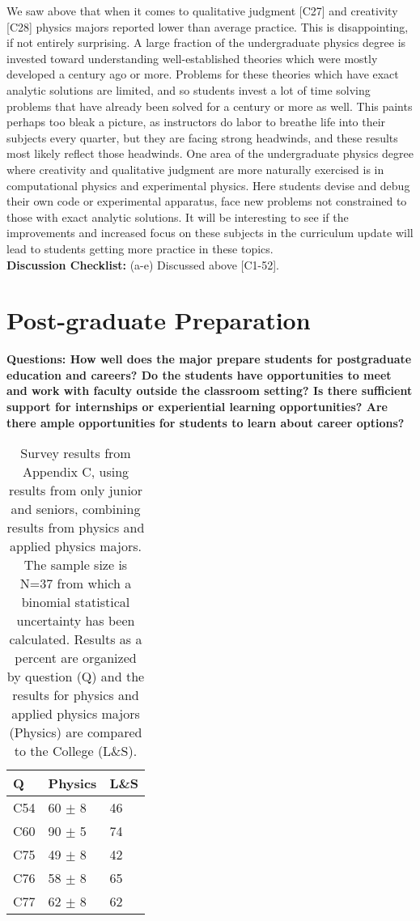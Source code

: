 \documentclass[12pt]{article}
\begin{document}
We saw above that when it comes to qualitative judgment [C27] and
creativity [C28] physics majors reported lower than average practice.
This is disappointing, if not entirely surprising.  A large fraction
of the undergraduate physics degree is invested toward understanding
well-established theories which were mostly developed a century ago or
more.  Problems for these theories which have exact analytic solutions
are limited, and so students invest a lot of time solving problems
that have already been solved for a century or more as well.  This
paints perhaps too bleak a picture, as instructors do labor to breathe
life into their subjects every quarter, but they are facing strong
headwinds, and these results most likely reflect those headwinds.  One
area of the undergraduate physics degree where creativity and
qualitative judgment are more naturally exercised is in computational
physics and experimental physics.  Here students devise and debug
their own code or experimental apparatus, face new problems not
constrained to those with exact analytic solutions.  It will be
interesting to see if the improvements and increased focus on these
subjects in the curriculum update will lead to students getting more
practice in these topics.\\[3pt]

\noindent
{\bf Discussion Checklist:} (a-e) Discussed above [C1-52].

\newpage
\section{Post-graduate Preparation}
{\bf Questions: How well does the major prepare students for
  postgraduate education and careers?  Do the students have
  opportunities to meet and work with faculty outside the classroom
  setting? Is there sufficient support for internships or experiential
  learning opportunities?  Are there ample opportunities for students
  to learn about career options?}

\begin{table}[htbp]
\caption{\label{tbl:appcii} Survey results from Appendix C, using
  results from only junior and seniors, combining results from physics
  and applied physics majors. The sample size is N=37 from which a
  binomial statistical uncertainty has been calculated.  Results as a
  percent are organized by question (Q) and the results for physics
  and applied physics majors (Physics) are compared to the College
  (L\&S).}
\begin{center}
\begin{tabular}{|lll|}
\hline
Q & Physics & L\&S \\
\hline
C54 & 60 $\pm$ 8 & 46 \\ 
C60 & 90 $\pm$ 5 & 74 \\
C75 & 49 $\pm$ 8 & 42 \\ 
C76 & 58 $\pm$ 8 & 65 \\ 
C77 & 62 $\pm$ 8 & 62 \\ 
\hline 
\end{tabular}
\end{center}
\end{table}
\end{document}
